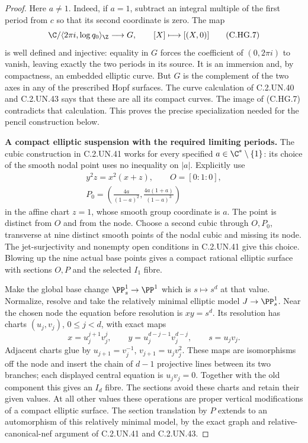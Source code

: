 \begin{proof}
Here $a\ne1$. Indeed, if $a=1$, subtract an
integral multiple of the first period from $c$
so that its second coordinate is zero. The map
\[
 \C/\langle2\pi i,\log q_0\rangle_{\Z}
          \longrightarrow G,\qquad [X]\longmapsto[(X,0)]
\tag{C.HG.7}
\]
is well defined and injective: equality in $G$
forces the coefficient of $(0,2\pi i)$ to vanish,
leaving exactly the two periods in its source.
It is an immersion and, by compactness, an embedded
elliptic curve. But $G$ is the complement of the
two axes in any of the prescribed Hopf surfaces.
The curve calculation of C.2.UN.40 and C.2.UN.43
says that these are all its compact curves.
The image of (C.HG.7) contradicts that calculation.
This proves the precise specialization needed
for the pencil construction below.

\par\medskip\noindent\textbf{A compact elliptic suspension with the required limiting periods.}
The cubic construction in C.2.UN.41 works for
every specified $a\in\C^*\setminus\{1\}$:
its choice of the smooth nodal point uses no
inequality on $|a|$. Explicitly use
\[
 \begin{gathered}
 y^2z=x^2(x+z),\qquad O=[0:1:0],\\
 P_0=\left(\frac{4a}{(1-a)^2},
                  \frac{4a(1+a)}{(1-a)^3}\right)
 \end{gathered}
\tag{C.HG.8}
\]
in the affine chart $z=1$, whose smooth group
coordinate is $a$. The point is distinct from
$O$ and from the node. Choose a second cubic
through $O,P_0$, transverse at nine distinct
smooth points of the nodal cubic and missing
its node. The jet-surjectivity and nonempty
open conditions in C.2.UN.41 give this choice.
Blowing up the nine actual base points gives
a compact rational elliptic surface with
sections $O,P$ and the selected $I_1$ fibre.

Make the global base change $\PP^1_s\to\PP^1$
which is $s\mapsto s^d$ at that value.
Normalize, resolve and take the relatively
minimal elliptic model $J\to\PP^1_s$.
Near the chosen node the equation before
resolution is $xy=s^d$. Its resolution has
charts $(u_j,v_j)$, $0\le j<d$, with exact maps
\[
 x=u_j^{j+1}v_j^j,\qquad
 y=u_j^{d-j-1}v_j^{d-j},\qquad s=u_jv_j.
\]
Adjacent charts glue by
$u_{j+1}=v_j^{-1}$, $v_{j+1}=u_jv_j^2$.
These maps are isomorphisms off the node and
insert the chain of $d-1$ projective lines
between its two branches; each displayed
central equation is $u_jv_j=0$.
Together with the old component
this gives an $I_d$ fibre. The sections avoid
these charts and retain their given values.
At all other values these operations are
proper vertical modifications of a compact
elliptic surface. The section translation by
$P$ extends to an automorphism of this
relatively minimal model, by the exact graph
and relative-canonical-nef argument of
C.2.UN.41 and C.2.UN.43.


\end{proof}
